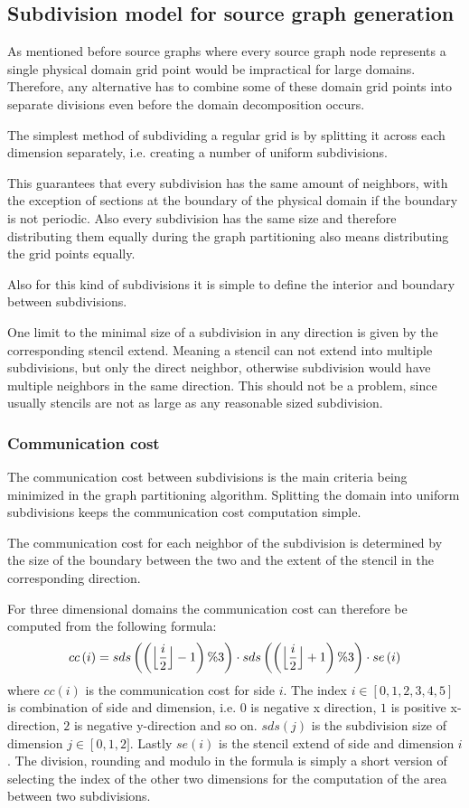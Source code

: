 \subsection{Subdivision model for source graph generation}
As mentioned before source graphs where every source graph node represents a single physical domain grid point would be impractical for large domains.
Therefore, any alternative has to combine some of these domain grid points into separate divisions even before the domain decomposition occurs.

The simplest method of subdividing a regular grid is by splitting it across each dimension separately, i.e. creating a number of uniform subdivisions.

This guarantees that every subdivision has the same amount of neighbors, with the exception of sections at the boundary of the physical domain if the boundary is not periodic.
Also every subdivision has the same size and therefore distributing them equally during the graph partitioning also means distributing the grid points equally.

Also for this kind of subdivisions it is simple to define the interior and boundary between subdivisions.

One limit to the minimal size of a subdivision in any direction is given by the corresponding stencil extend.
Meaning a stencil can not extend into multiple subdivisions, but only the direct neighbor, otherwise subdivision would have multiple neighbors in the same direction.
This should not be a problem, since usually stencils are not as large as any reasonable sized subdivision.

\subsubsection{Communication cost}
The communication cost between subdivisions is the main criteria being minimized in the graph partitioning algorithm.
Splitting the domain into uniform subdivisions keeps the communication cost computation simple.

The communication cost for each neighbor of the subdivision is determined by the size of the boundary between the two and the extent of the stencil in the corresponding direction.

For three dimensional domains the communication cost can therefore be computed from the following formula:
\begin{equation}
cc\left(i\right) = sds\left(\left(\floor[\Big]{\frac{i}{2}} - 1\right) \% 3 \right) \cdot sds\left(\left(\floor[\Big]{\frac{i}{2}} + 1\right) \% 3 \right) \cdot se\left(i\right)
\end{equation}
where $cc\left(i\right)$ is the communication cost for side $i$.
The index $i \in \left[0, 1, 2, 3, 4, 5\right]$ is combination of side and dimension, i.e. $0$ is negative x direction, $1$ is positive x-direction, $2$ is negative y-direction and so on.
$sds\left(j\right)$ is the subdivision size of dimension $j \in \left[0,1,2]$.
Lastly $se\left(i\right)$ is the stencil extend of side and dimension $i$.
The division, rounding and modulo in the formula is simply a short version of selecting the index of the other two dimensions for the computation of the area between two subdivisions.

